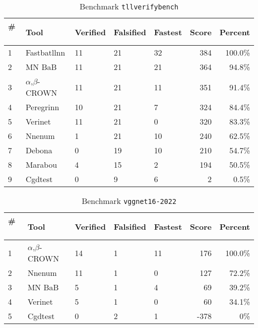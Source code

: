 \begin{table}[h]
\begin{center}
\caption{Benchmark \texttt{tllverifybench}} \label{tab:cat_{cat}}
{\setlength{\tabcolsep}{2pt}
\begin{tabular}[h]{@{}lllllrr@{}}
\toprule
\textbf{\# ~} & \textbf{Tool} & \textbf{Verified} & \textbf{Falsified} & \textbf{Fastest} & \textbf{Score} & \textbf{Percent}\\
\midrule
1 & Fastbatllnn & 11 & 21 & 32 & 384 & 100.0\% \\
2 & MN BaB & 11 & 21 & 21 & 364 & 94.8\% \\
3 & $\alpha$,$\beta$-CROWN & 11 & 21 & 11 & 351 & 91.4\% \\
4 & Peregrinn & 10 & 21 & 7 & 324 & 84.4\% \\
5 & Verinet & 11 & 21 & 0 & 320 & 83.3\% \\
6 & Nnenum & 1 & 21 & 10 & 240 & 62.5\% \\
7 & Debona & 0 & 19 & 10 & 210 & 54.7\% \\
8 & Marabou & 4 & 15 & 2 & 194 & 50.5\% \\
9 & Cgdtest & 0 & 9 & 6 & 2 & 0.5\% \\
\bottomrule
\end{tabular}
}
\end{center}
\end{table}




\begin{table}[h]
\begin{center}
\caption{Benchmark \texttt{vggnet16-2022}} \label{tab:cat_{cat}}
{\setlength{\tabcolsep}{2pt}
\begin{tabular}[h]{@{}lllllrr@{}}
\toprule
\textbf{\# ~} & \textbf{Tool} & \textbf{Verified} & \textbf{Falsified} & \textbf{Fastest} & \textbf{Score} & \textbf{Percent}\\
\midrule
1 & $\alpha$,$\beta$-CROWN & 14 & 1 & 11 & 176 & 100.0\% \\
2 & Nnenum & 11 & 1 & 0 & 127 & 72.2\% \\
3 & MN BaB & 5 & 1 & 4 & 69 & 39.2\% \\
4 & Verinet & 5 & 1 & 0 & 60 & 34.1\% \\
5 & Cgdtest & 0 & 2 & 1 & -378 & 0\% \\
\bottomrule
\end{tabular}
}
\end{center}
\end{table}

